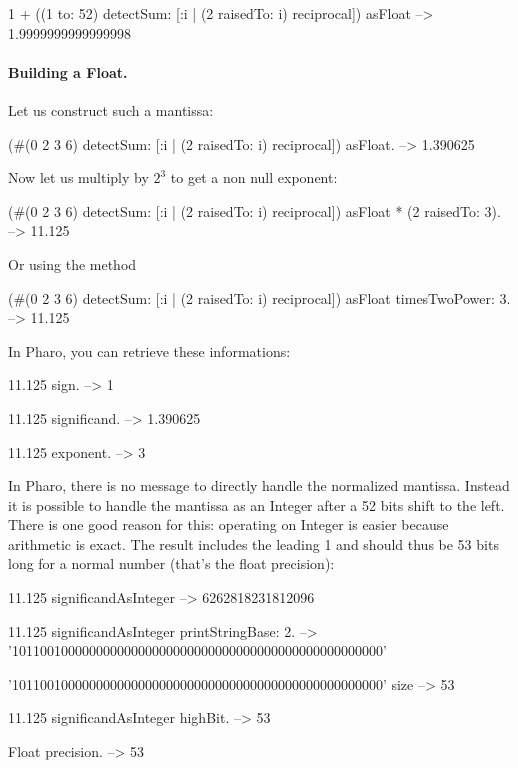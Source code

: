 \documentclass[a4paper,10pt,twoside]{book}
\begin{document}
\begin{code}{}
1 + ((1 to: 52) detectSum: [:i | (2 raisedTo: i) reciprocal]) asFloat 
	--> 1.9999999999999998
\end{code}




\paragraph{Building a Float.}
Let us construct such a mantissa:
\begin{code}{}
(#(0 2 3 6) detectSum: [:i | (2 raisedTo: i) reciprocal]) asFloat.
	--> 1.390625
\end{code}

Now let us multiply by $2^3$ to get a non null exponent:

\begin{code}{}
(#(0 2 3 6) detectSum: [:i | (2 raisedTo: i) reciprocal]) asFloat * (2 raisedTo: 3). 
	--> 11.125
\end{code}

Or using the method 

\begin{code}{}
(#(0 2 3 6) detectSum: [:i | (2 raisedTo: i) reciprocal]) asFloat timesTwoPower: 3.
	--> 11.125
\end{code}

In Pharo, you can retrieve these informations:
 \begin{code}{}
11.125 sign.
	--> 1
	
11.125 significand.
	--> 1.390625
	
11.125 exponent.
	--> 3
\end{code}

In Pharo, there is no message to directly handle the normalized mantissa. Instead it is possible to handle the mantissa as an Integer after a 52 bits shift to the left. There is one good reason for this: operating on Integer is easier because arithmetic is exact. The result includes the leading 1 and should thus be 53 bits long for a normal number (that's the float precision):


\begin{code}{}
11.125 significandAsInteger 
	--> 6262818231812096 
 
11.125 significandAsInteger printStringBase: 2.
	--> '10110010000000000000000000000000000000000000000000000'
	
'10110010000000000000000000000000000000000000000000000' size
	--> 53
	
11.125 significandAsInteger highBit.
	--> 53
	
Float precision.
	--> 53
\end{code}
\end{document}
